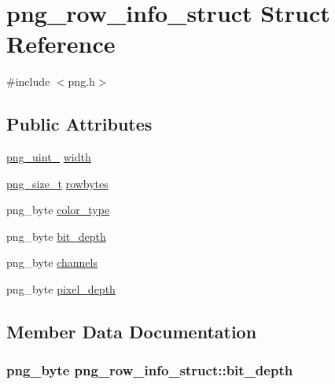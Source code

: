 \hypertarget{structpng__row__info__struct}{}\section{png\+\_\+row\+\_\+info\+\_\+struct Struct Reference}
\label{structpng__row__info__struct}


{\ttfamily \#include $<$png.\+h$>$}

\subsection*{Public Attributes}
\begin{DoxyCompactItemize}
\item 
\hyperlink{pngrutil_8c_a89824d0e9f0724e3e7799b01a2b5fe58}{png\+\_\+uint\+\_} \hyperlink{structpng__row__info__struct_a1ab107da5ffee8100eeaa76cc5ba3e62}{width}
\item 
\hyperlink{pngconf_8h_a975e35d0a699ea3b08b8feef90fd29eb}{png\+\_\+size\+\_\+t} \hyperlink{structpng__row__info__struct_a924a208653f2577c05db5e1cf3aa5817}{rowbytes}
\item 
png\+\_\+byte \hyperlink{structpng__row__info__struct_a646244422549c66e6661cfcdb67c8e28}{color\+\_\+type}
\item 
png\+\_\+byte \hyperlink{structpng__row__info__struct_a6b14d5d0cc32f151c28c568cf1c1f82d}{bit\+\_\+depth}
\item 
png\+\_\+byte \hyperlink{structpng__row__info__struct_a7cefee70361a3789a862001aefcd872f}{channels}
\item 
png\+\_\+byte \hyperlink{structpng__row__info__struct_a70b84917ef9eabc9b7d29ec96fd01153}{pixel\+\_\+depth}
\end{DoxyCompactItemize}


\subsection{Member Data Documentation}
\hypertarget{structpng__row__info__struct_a6b14d5d0cc32f151c28c568cf1c1f82d}{}
\subsubsection[{bit\+\_\+depth}]{\setlength{\rightskip}{0pt plus 5cm}png\+\_\+byte png\+\_\+row\+\_\+info\+\_\+struct\+::bit\+\_\+depth}\label{structpng__row__info__struct_a6b14d5d0cc32f151c28c568cf1c1f82d}
\hypertarget{structpng__row__info__struct_a7cefee70361a3789a862001aefcd872f}{}
